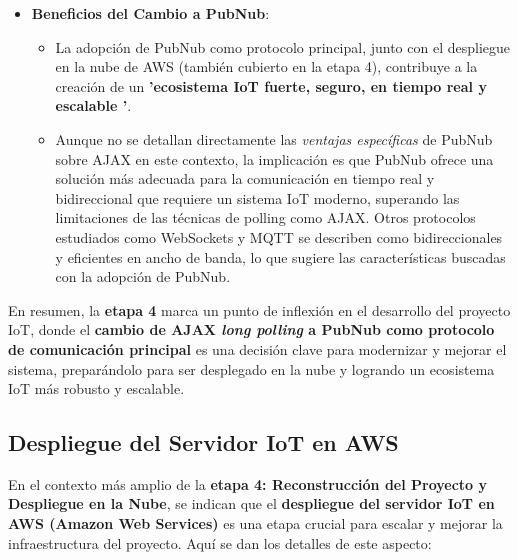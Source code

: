 \documentclass{report}
\begin{document}
\begin{itemize}
    \item \textbf{Beneficios del Cambio a PubNub}:
    \begin{itemize}
        \item La adopción de PubNub como protocolo principal, junto con el despliegue en la nube de AWS (también cubierto en la etapa 4), contribuye a 
        la creación de un \textbf{ 'ecosistema IoT fuerte, seguro, en tiempo real y escalable '}.
        \item Aunque no se  detallan directamente las \textit{ventajas específicas} de PubNub sobre AJAX en este contexto, la implicación es 
        que PubNub ofrece una solución más adecuada para la comunicación en tiempo real y bidireccional que requiere un sistema IoT moderno, superando 
        las limitaciones de las técnicas de polling como AJAX. Otros protocolos estudiados como WebSockets y MQTT se describen como bidireccionales y 
        eficientes en ancho de banda, lo que sugiere las características buscadas con la adopción de PubNub.
    \end{itemize}
\end{itemize}
En resumen, la \textbf{etapa 4} marca un punto de inflexión en el desarrollo del proyecto IoT, donde el \textbf{cambio de AJAX \textit{long polling} a 
PubNub como protocolo de comunicación principal} es una decisión clave para modernizar y mejorar el sistema, preparándolo para ser desplegado en la nube 
y logrando un ecosistema IoT más robusto y escalable.

\subsection{Despliegue del Servidor IoT en AWS}
En el contexto más amplio de la \textbf{etapa 4: Reconstrucción del Proyecto y Despliegue en la Nube}, se  indican que el 
\textbf{despliegue del servidor IoT en AWS (Amazon Web Services)} es una etapa crucial para escalar y mejorar la infraestructura del proyecto. 
Aquí se dan los detalles de este aspecto:
\end{document}
